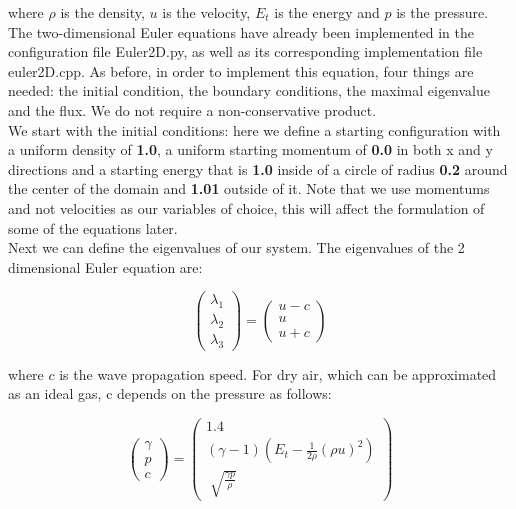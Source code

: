 \documentclass[12pt,letterpaper]{article}
\begin{document}
where $\rho$ is the density, $u$ is the velocity, $E_t$ is the energy and $p$ is the pressure.\\
The two-dimensional Euler equations have already been implemented in the configuration file Euler2D.py, as well as its corresponding implementation file euler2D.cpp. As before, in order to implement this equation, four things are needed: the initial condition, the boundary conditions, the maximal eigenvalue and the flux. We do not require a non-conservative product.\\

We start with the initial conditions: here we define a starting configuration with a uniform density of \textbf{1.0}, a uniform starting momentum of \textbf{0.0} in both x and y directions and a starting energy that is \textbf{1.0} inside of a circle of radius \textbf{0.2} around the center of the domain and \textbf{1.01} outside of it. Note that we use momentums and not velocities as our variables of choice, this will affect the formulation of some of the equations later.\\

Next we can define the eigenvalues of our system. The eigenvalues of the 2 dimensional Euler equation are:

\begin{equation*}
    \left(
    \begin{array}{lr} \lambda_1 \\
                      \lambda_2 \\
                      \lambda_3
                      \end{array} \right) =
    \left(
    \begin{array}{lr} u - c \\
                      u \\
                      u + c
                      \end{array} \right)
\end{equation*}

where $c$ is the wave propagation speed. For dry air, which can be approximated as an ideal gas, c depends on the pressure as follows:

\begin{equation*}
    \left(
    \begin{array}{lr} \gamma \\
    				  p \\
                      c
                      \end{array} \right) =
    \left(
    \begin{array}{lr}	 1.4 \\ 
					    (\gamma - 1) ( E_t - \frac{1}{2 \rho} (\rho u)^2 ) \\
    					\sqrt[]{\frac{\gamma  p}{\rho}}
                      	\end{array} \right)
\end{equation*}
\end{document}

